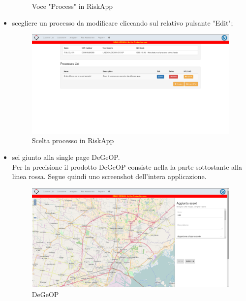 \begin{itemize}
\begin{figure}[H]
		\caption{Voce "Process" in RiskApp}
		\end{figure}
	\item scegliere un processo da modificare cliccando sul relativo pulsante "Edit";
		\begin{figure}[H]
		\centering
		\includegraphics[width=\textwidth]{img/accessoDeGeOP/s5-select_process.png}
		\caption{Scelta processo in RiskApp}
		\end{figure}
	\item sei giunto alla single page DeGeOP.
	\\Per la precisione il prodotto DeGeOP consiste nella la parte sottostante alla linea rossa. Segue quindi uno screenshot dell'intera applicazione.
		\begin{figure}[H]
		\centering
		\includegraphics[width=\textwidth]{img/accessoDeGeOP/s6-DeGeOP.png}
		\caption{DeGeOP}
		\end{figure}
\end{itemize}
